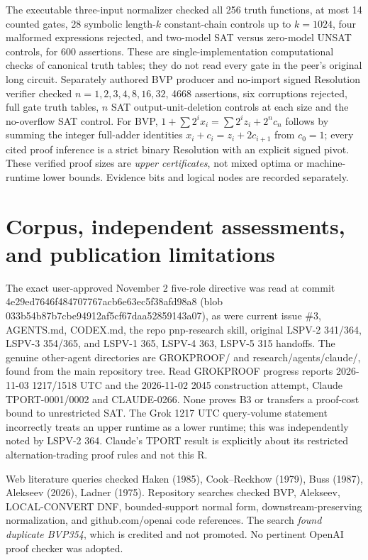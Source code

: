 \documentclass[11pt]{article}
\begin{document}
The executable three-input normalizer checked all 256 truth functions, at most 14 counted gates, 28 symbolic length-$k$ constant-chain controls up to $k=1024$, four malformed expressions rejected, and two-model SAT versus zero-model UNSAT controls, for 600 assertions. These are single-implementation computational checks of canonical truth tables; they do not read every gate in the peer's original long circuit. Separately authored BVP producer and no-import signed Resolution verifier checked $n=1,2,3,4,8,16,32$, 4668 assertions, six corruptions rejected, full gate truth tables, $n$ SAT output-unit-deletion controls at each size and the no-overflow SAT control. For BVP, $1+\sum2^ix_i=\sum2^iz_i+2^nc_n$ follows by summing the integer full-adder identities $x_i+c_i=z_i+2c_{i+1}$ from $c_0=1$; every cited proof inference is a strict binary Resolution with an explicit signed pivot. These verified proof sizes are \emph{upper certificates}, not mixed optima or machine-runtime lower bounds. Evidence bits and logical nodes are recorded separately.

\section*{Corpus, independent assessments, and publication limitations}
The exact user-approved November 2 five-role directive was read at commit 4e29ed7646f484707767acb6e63ec5f38afd98a8 (blob 033b54b87b7cbe94912af5cf67daa52859143a07), as were current issue \#3, AGENTS.md, CODEX.md, the repo pnp-research skill, original LSPV-2 341/364, LSPV-3 354/365, and LSPV-1 365, LSPV-4 363, LSPV-5 315 handoffs. The genuine other-agent directories are GROKPROOF/ and research/agents/claude/, found from the main repository tree. Read GROKPROOF progress reports 2026-11-03 1217/1518 UTC and the 2026-11-02 2045 construction attempt, Claude TPORT-0001/0002 and CLAUDE-0266. None proves B3 or transfers a proof-cost bound to unrestricted SAT. The Grok 1217 UTC query-volume statement incorrectly treats an upper runtime as a lower runtime; this was independently noted by LSPV-2 364. Claude's TPORT result is explicitly about its restricted alternation-trading proof rules and not this R.

Web literature queries checked Haken (1985), Cook--Reckhow (1979), Buss (1987), Alekseev (2026), Ladner (1975). Repository searches checked BVP, Alekseev, LOCAL-CONVERT DNF, bounded-support normal form, downstream-preserving normalization, and github.com/openai code references. The search \emph{found duplicate BVP354}, which is credited and not promoted. No pertinent OpenAI proof checker was adopted.
\end{document}
